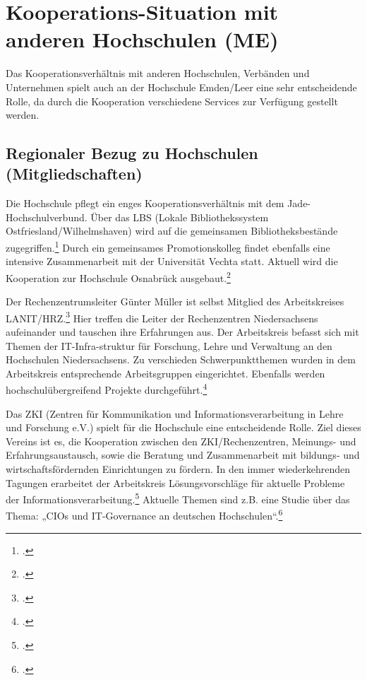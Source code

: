 \section{Kooperations-Situation mit anderen Hochschulen (ME)}
\label{section_kooperations_situation}

Das Kooperationsverhältnis mit anderen Hochschulen, Verbänden und Unternehmen spielt auch an der Hochschule Emden/Leer eine sehr entscheidende Rolle, da durch die Kooperation verschiedene Services zur Verfügung gestellt werden.

\subsection{Regionaler Bezug zu Hochschulen (Mitgliedschaften)}
Die Hochschule pflegt ein enges Kooperationsverhältnis mit dem Jade-Hochschulverbund. Über das LBS (Lokale Bibliothekssystem Ostfriesland/Wilhelmshaven) wird auf die gemeinsamen  Bibliotheksbestände zugegriffen.\footcite{jadehs_online_kataloge_2015} Durch ein gemeinsames Promotionskolleg findet ebenfalls eine intensive Zusammenarbeit mit der Universität Vechta statt. Aktuell wird die Kooperation zur Hochschule Osnabrück ausgebaut.\footcite[Vgl.][]{hsel_profil_2015}

Der Rechenzentrumsleiter Günter Müller ist selbst Mitglied des Arbeitskreises LANIT/HRZ.\footcite[Vgl.][]{lanit_mitglieder_2011} Hier treffen die Leiter der Rechenzentren Niedersachsens aufeinander und tauschen ihre Erfahrungen aus. Der Arbeitskreis befasst sich mit Themen der IT-Infra-struktur für Forschung, Lehre und Verwaltung an den Hochschulen Niedersachsens. Zu verschieden Schwerpunktthemen wurden in dem Arbeitskreis entsprechende Arbeitsgruppen eingerichtet.  Ebenfalls werden hochschulübergreifend Projekte durchgeführt.\footcite[Vgl.][]{lanit_home_2014}

Das ZKI (Zentren für Kommunikation und Informationsverarbeitung in Lehre und Forschung e.V.) spielt für die Hochschule eine entscheidende Rolle. Ziel dieses Vereins ist es, die Kooperation zwischen den ZKI/Rechenzentren, Meinungs- und Erfahrungsaustausch, sowie die Beratung und Zusammenarbeit mit bildungs- und wirtschaftsfördernden Einrichtungen zu fördern. In den immer wiederkehrenden Tagungen erarbeitet der Arbeitskreis Lösungsvorschläge für aktuelle Probleme der Informationsverarbeitung.\footcite[Vgl.][]{zki_verein_2015} Aktuelle Themen sind z.B. eine Studie über das Thema: „CIOs und IT-Governance an deutschen Hochschulen“.\footcite{zki_beitrag_CIOs_2014}

